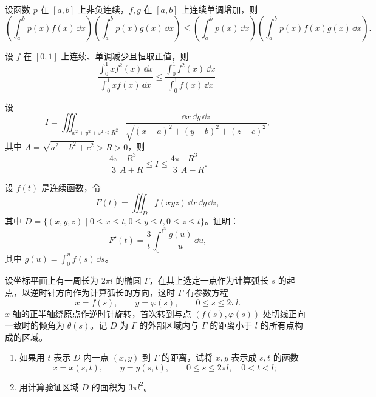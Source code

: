 \begin{xreferenceproblem}[11]
设函数 $p$ 在 $[a,b]$ 上非负连续，$f,g$ 在 $[a,b]$ 上连续单调增加，则
  \[
    \left(\int_a^b p(x)f(x)\,\dd x\right)
    \left(\int_a^b p(x)g(x)\,\dd x\right)
    \le\left(\int_a^b p(x)\,\dd x\right)
    \left(\int_a^b p(x)f(x)g(x)\,\dd x\right).
  \]
\end{xreferenceproblem}

\begin{xreferenceproblem}[12]
设 $f$ 在 $[0,1]$ 上连续、单调减少且恒取正值，则
  \[
    \frac{\int_0^1xf^2(x)\,\dd x}{\int_0^1xf(x)\,\dd x}
    \le\frac{\int_0^1f^2(x)\,\dd x}{\int_0^1f(x)\,\dd x}.
  \]
\end{xreferenceproblem}

\begin{xreferenceproblem}[13]
设
  \[
    I=\iiint_{x^2+y^2+z^2\le R^2}\frac{\dd x\,\dd y\,\dd z}{\sqrt{(x-a)^2+(y-b)^2+(z-c)^2}},
  \]
  其中 $A=\sqrt{a^2+b^2+c^2}>R>0$，则
  \[
    \frac{4\pi}{3}\frac{R^3}{A+R}\le I\le\frac{4\pi}{3}\frac{R^3}{A-R}.
  \]
\end{xreferenceproblem}

\begin{xreferenceproblem}[14]
设 $f(t)$ 是连续函数，令
  \[
    F(t)=\iiint_D f(xyz)\,\dd x\,\dd y\,\dd z,
  \]
  其中 $D=\{(x,y,z)\mid0\le x\le t,0\le y\le t,0\le z\le t\}$。证明：
  \[
    F'(t)=\frac3t\int_0^{t^3}\frac{g(u)}u\,\dd u,
  \]
  其中 $g(u)=\int_0^u f(s)\,\dd s$。
\end{xreferenceproblem}

\begin{xreferenceproblem}[15]
设坐标平面上有一周长为 $2\pi l$ 的椭圆 $\Gamma$，在其上选定一点作为计算弧长 $s$ 的起点，以逆时针方向作为计算弧长的方向，这时 $\Gamma$ 有参数方程
  \[
    x=f(s),\qquad y=\varphi(s),\qquad0\le s\le2\pi l.
  \]
  $x$ 轴的正半轴绕原点作逆时针旋转，首次转到与点 $(f(s),\varphi(s))$ 处切线正向一致时的倾角为 $\theta(s)$。记 $D$ 为 $\Gamma$ 的外部区域内与 $\Gamma$ 的距离小于 $l$ 的所有点构成的区域。
  \begin{enumerate}[label=(\arabic*)]
    \item 如果用 $t$ 表示 $D$ 内一点 $(x,y)$ 到 $\Gamma$ 的距离，试将 $x,y$ 表示成 $s,t$ 的函数
    \[
      x=x(s,t),\qquad y=y(s,t),\qquad0\le s\le2\pi l,\quad0<t<l;
    \]
    \item 用计算验证区域 $D$ 的面积为 $3\pi l^2$。
  \end{enumerate}
\end{xreferenceproblem}

